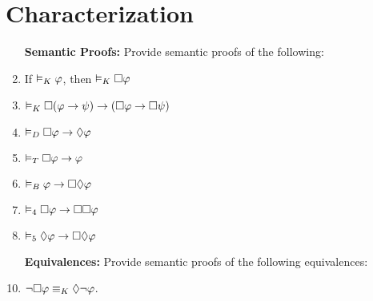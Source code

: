 \documentclass[a4paper, 11pt]{article}                  %
\begin{document}
\section{Characterization}

\begin{enumerate}

	\item[\bf Semantic Proofs:] Provide semantic proofs of the following:

	\item If $\MLmodels[K] \metaA$, then $\MLmodels[K] \Box\metaA$

	\item $\MLmodels[K] \Box(\metaA \rightarrow \metaB)\rightarrow(\Box\metaA \rightarrow \Box\metaB)$

	\item $\MLmodels[D] \Box \metaA \rightarrow\Diamond \metaA$

	\item $\MLmodels[T] \Box \metaA \rightarrow \metaA$

	\item $\MLmodels[B] \metaA \rightarrow \Box\Diamond\metaA$

	\item $\MLmodels[4] \Box\metaA \rightarrow \Box\Box\metaA$

	\item $\MLmodels[5] \Diamond\metaA \rightarrow \Box\Diamond\metaA$

	\item[\bf Equivalences:] Provide semantic proofs of the following equivalences:

	\item $\neg\Box \metaA \MLequiv[K] \Diamond\neg \metaA$.


\end{enumerate}
\end{document}
